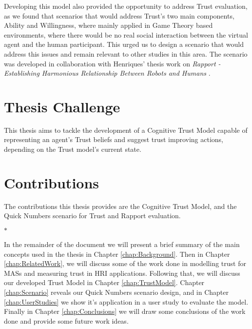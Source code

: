 Developing this model also provided the opportunity to address Trust evaluation, as we found that scenarios that would address Trust's two main components, Ability and Willingness, where mainly applied in Game Theory based environments, where there would be no real social interaction between the virtual agent and the human participant. This urged us to design a scenario that would address this issues and remain relevant to other studies in this area. The scenario was developed in collaboration with Henriques' thesis work on \textit{Rapport - Establishing Harmonious Relationship Between Robots and Humans} \cite{Henriques2016}.


\section{Thesis Challenge}
This thesis aims to tackle the development of a Cognitive Trust Model capable of representing an agent's Trust beliefs and suggest trust improving actions, depending on the Trust model's current state.


\section{Contributions}
The contributions this thesis provides are the Cognitive Trust Model, and the Quick Numbers scenario for Trust and Rapport evaluation.
\begin{center}
    $\ast$
\end{center}
In the remainder of the document we will present a brief summary of the main concepts used in the thesis in Chapter \ref{chap:Background}. Then in Chapter \ref{chap:RelatedWork}, we will discuss some of the work done in modelling trust for \acp{MAS} and measuring trust in \ac{HRI} applications. Following that, we will discuss our developed Trust Model in Chapter \ref{chap:TrustModel}. Chapter \ref{chap:Scenario} reveals our Quick Numbers scenario design, and in Chapter \ref{chap:UserStudies} we show it's application in a user study to evaluate the model. Finally in Chapter \ref{chap:Conclusions} we will draw some conclusions of the work done and provide some future work ideas.
